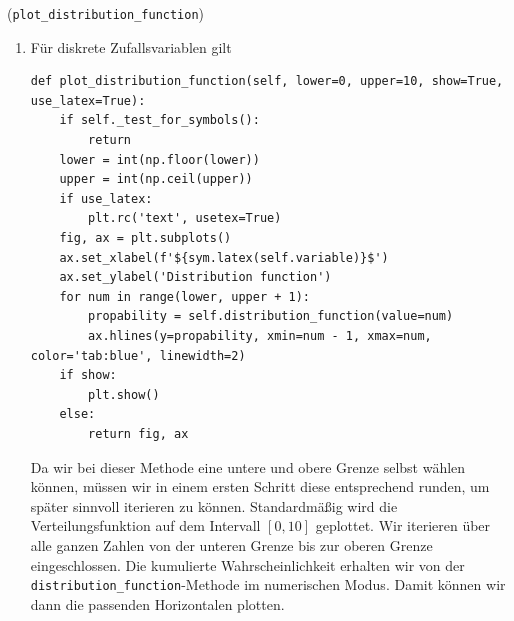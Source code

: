\begin{Code}{(\lstinline|plot_distribution_function|)}
\begin{enumerate}[label=(\roman*)]
\item Für diskrete Zufallsvariablen gilt
\begin{lstlisting}
def plot_distribution_function(self, lower=0, upper=10, show=True, use_latex=True):
    if self._test_for_symbols():
        return
    lower = int(np.floor(lower))
    upper = int(np.ceil(upper))
    if use_latex:
        plt.rc('text', usetex=True)
    fig, ax = plt.subplots()
    ax.set_xlabel(f'${sym.latex(self.variable)}$')
    ax.set_ylabel('Distribution function')
    for num in range(lower, upper + 1):
        propability = self.distribution_function(value=num)
        ax.hlines(y=propability, xmin=num - 1, xmax=num, color='tab:blue', linewidth=2)
    if show:
        plt.show()
    else:
        return fig, ax
\end{lstlisting}
Da wir bei dieser Methode eine untere und obere Grenze selbst wählen können, müssen wir in einem ersten Schritt diese entsprechend runden, um später sinnvoll iterieren zu können. Standardmäßig wird die Verteilungsfunktion auf dem Intervall $[0, 10]$ geplottet. Wir iterieren über alle ganzen Zahlen von der unteren Grenze bis zur oberen Grenze eingeschlossen. Die kumulierte Wahrscheinlichkeit erhalten wir von der \lstinline|distribution_function|-Methode im numerischen Modus. Damit können wir dann die passenden Horizontalen plotten.


\end{enumerate}
\end{Code}
